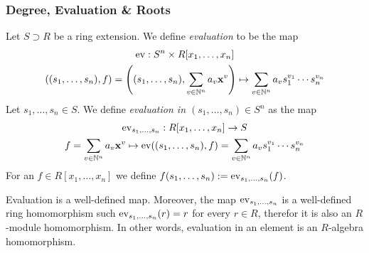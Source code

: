 \subsubsection{Degree, Evaluation \& Roots}
\begin{definition}
    Let $S\supset R$ be a ring extension. We define \textit{evaluation} to be the map
    \begin{gather*}
        \mathrm{ev} : S^n \times R[x_1,\dots,x_n]\\
        ((s_1,\dots,s_n),f)=\left((s_1,\dots,s_n),\sum_{v\in\mathbb{N}^n} a_v\mathbf{x}^v\right)\mapsto \sum_{v\in \mathbb{N}^n} a_vs_1^{v_1}\cdots s_n^{v_n}
    \end{gather*}
    Let $s_1,\dots,s_n\in S$. We define \textit{evaluation in $(s_1,\dots,s_n)\in S^n$} as the map 
    \begin{gather*}
        \mathrm{ev}_{s_1,\dots,s_n} : R[x_1,\dots,x_n] \rightarrow S\\
        f = \sum_{v\in\mathbb{N}^n} a_v \mathbf{x}^v \mapsto \mathrm{ev}((s_1,\dots,s_n),f)=\sum_{v\in\mathbb{N}^n} a_vs_1^{v_1}\cdots s_n^{v_n} 
    \end{gather*}
    For an $f\in R[x_1,\dots,x_n]$ we define $f(s_1,\dots,s_n) := \mathrm{ev}_{s_1,\dots,s_n}(f)$.
\end{definition}
\begin{lemma}\label{EvaluationIsARingHomomorphism}
    Evaluation is a well-defined map. Moreover, the map $\mathrm{ev}_{s_1,\dots,s_n}$ is a well-defined ring homomorphism such $\mathrm{ev}_{s_1,\dots,s_n}(r) = r$ for every $r\in R$, therefor it is also an $R$-module homomorphism. In other words, evaluation in an element is an $R$-algebra homomorphism. 
\end{lemma}
